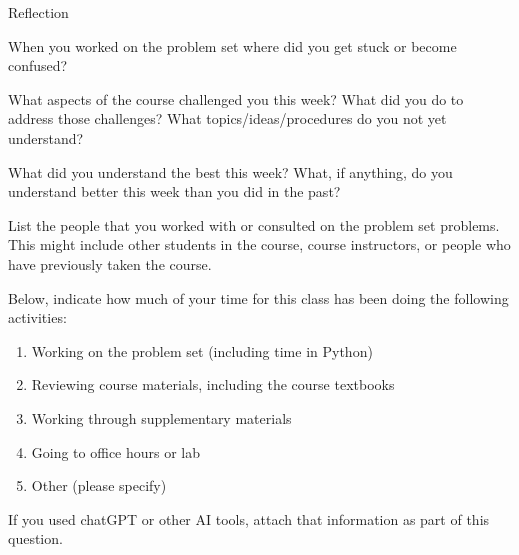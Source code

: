 \documentclass[12pt,letterpaper,noanswers]{exam}
\begin{document}
\begin{questions}


\question Reflection
\begin{parts}
\item When you worked on the problem set where did you get stuck or become confused?
\item What aspects of the course challenged you this week?  What did you do to address those challenges?  What topics/ideas/procedures do you not yet understand?
\item What did you understand the best this week?  What, if anything, do you understand better this week than you did in the past?
\item List the people that you worked with or consulted on the problem set problems.  This might include other students in the course, course instructors, or people who have previously taken the course.
\item Below, indicate how much of your time for this class has been doing the following activities:
	\begin{enumerate}
	\item Working on the problem set (including time in Python)
	\item Reviewing course materials, including the course textbooks
	\item Working through supplementary materials
	\item Going to office hours or lab
	\item Other (please specify)
	\end{enumerate}
\item If you used chatGPT or other AI tools, attach that information as part of this question.
\end{parts}


\end{questions}
  
\end{document}
